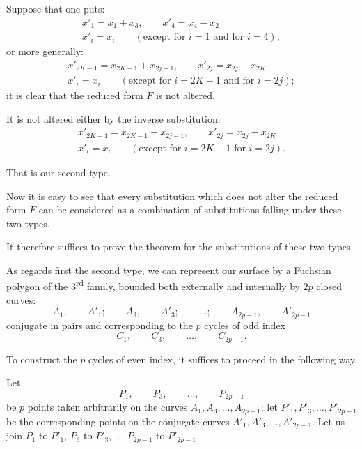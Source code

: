 \documentclass{article}
\begin{document}
Suppose that one puts:
\[ \begin{gathered} x'_{1} = x_{1} + x_{3}, \qquad x'_{4} = x_{4} - x_{2} \\ x'_{i} = x_{i} \qquad (\text{except for } i = 1 \text{ and for } i = 4), \end{gathered} \]
or more generally:
\[ \begin{gathered} x'_{2K-1} = x_{2K-1} + x_{2j-1}, \qquad x'_{2j} = x_{2j} - x_{2K} \\ x'_{i} = x_{i} \qquad (\text{except for } i = 2K - 1 \text{ and for } i = 2j); \end{gathered} \]
it is clear that the reduced form $F$ is not altered.

It is not altered either by the inverse substitution:
\[ \begin{gathered} x'_{2K-1} = x_{2K-1} - x_{2j-1}, \qquad x'_{2j} = x_{2j} + x_{2K} \\ x'_{i} = x_{i} \qquad (\text{except for } i = 2K - 1 \text{ for } i = 2j). \end{gathered} \]

That is our second type.

Now it is easy to see that every substitution which does not alter the reduced form $F$ can be considered as a combination of substitutions falling under these two types.

It therefore suffices to prove the theorem for the substitutions of these two types.

As regards first the second type, we can represent our surface by a Fuchsian polygon of the 3\textsuperscript{rd} family, bounded both externally and internally by $2p$ closed curves:
\[ A_{1}, \qquad A'_{1}; \qquad A_{3}, \qquad A'_{3}; \qquad \ldots; \qquad A_{2p-1}, \qquad A'_{2p-1} \]
conjugate in pairs and corresponding to the $p$ cycles of odd index
\[ C_{1}, \qquad C_{3}, \qquad \ldots, \qquad C_{2p-1}. \]

To construct the $p$ cycles of even index, it suffices to proceed in the following way.

Let
\[ P_{1}, \qquad P_{3}, \qquad \ldots, \qquad P_{2p-1} \]
be $p$ points taken arbitrarily on the curves $A_{1}, A_{3}, \ldots, A_{2p-1}$; let $P'_{1}, P'_{3}, \ldots, P'_{2p-1}$ be the corresponding points on the conjugate curves $A'_{1}, A'_{3}, \ldots, A'_{2p-1}$. Let us join $P_{1}$ to $P'_{1}$, $P_{3}$ to $P'_{3}$, \ldots, $P_{2p-1}$ to $P'_{2p-1}$
\end{document}
